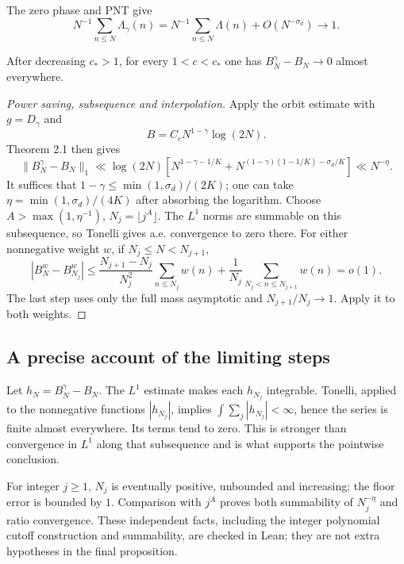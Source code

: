 The zero phase and PNT give
\[
 N^{-1}\sum_{n\leq N}\Lambda_\gamma(n)
 =N^{-1}\sum_{n\leq N}\Lambda(n)+O(N^{-\sigma_d})\longrightarrow1.
\]

\begin{proposition}\label{p:pointwise-comparison}
\leanok
After decreasing $c_*>1$, for every $1<c<c_*$ one has
$B_N^\gamma-B_N\to0$ almost everywhere.
\end{proposition}
\begin{proof}[Power saving, subsequence and interpolation]
\leanok
Apply the orbit estimate with $g=D_\gamma$ and
\[B=C_cN^{1-\gamma}\log(2N).\]
Theorem 2.1 then gives
\[
 \|B_N^\gamma-B_N\|_1\ll\log(2N)
 \left[N^{1-\gamma-1/K}
 +N^{(1-\gamma)(1-1/K)-\sigma_d/K}\right]\ll N^{-\eta}.
\]
It suffices that $1-\gamma\leq\min(1,\sigma_d)/(2K)$; one can take $\eta=\min(1,\sigma_d)/(4K)$ after absorbing the logarithm. Choose $A>\max(1,\eta^{-1})$, $N_j=\lfloor j^A\rfloor$. The $L^1$ norms are summable on this subsequence, so Tonelli gives a.e. convergence to zero there. For either nonnegative weight $w$, if $N_j\leq N<N_{j+1}$,
\[
 |B_N^w-B_{N_j}^w|
 \leq\frac{N_{j+1}-N_j}{N_j^2}\sum_{n\leq N_j}w(n)
 +\frac1{N_j}\sum_{N_j<n\leq N_{j+1}}w(n)=o(1).
\]
The last step uses only the full mass asymptotic and $N_{j+1}/N_j\to1$. Apply it to both weights.
\end{proof}
\ifDetailed
\subsection*{A precise account of the limiting steps}
Let $h_N=B_N^\gamma-B_N$. The $L^1$ estimate makes each $h_{N_j}$ integrable. Tonelli, applied to the nonnegative functions $|h_{N_j}|$, implies $\int\sum_j|h_{N_j}|<\infty$, hence the series is finite almost everywhere. Its terms tend to zero. This is stronger than convergence in $L^1$ along that subsequence and is what supports the pointwise conclusion.

For integer $j\geq1$, $N_j$ is eventually positive, unbounded and increasing; the floor error is bounded by $1$. Comparison with $j^A$ proves both summability of $N_j^{-\eta}$ and ratio convergence. These independent facts, including the integer polynomial cutoff construction and summability, are checked in Lean; they are not extra hypotheses in the final proposition.

